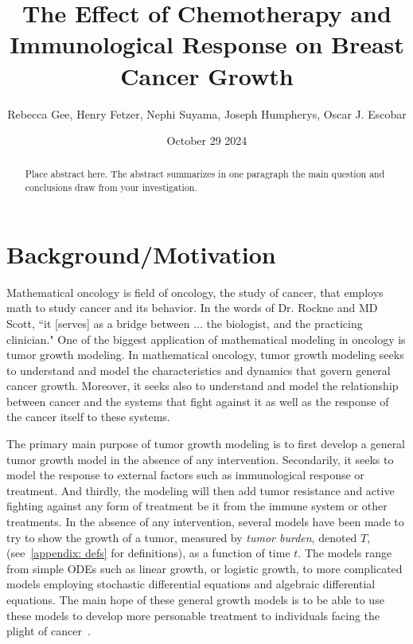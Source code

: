 \documentclass[11pt]{amsart}
\title{The Effect of Chemotherapy and Immunological Response on Breast Cancer Growth}
\author{Rebecca Gee, Henry Fetzer, Nephi Suyama, Joseph Humpherys, Oscar J. Escobar}
\date{October 29 2024} %
\begin{document}
\maketitle %

\begin{abstract}
Place abstract here. The abstract summarizes in one paragraph the main question and conclusions draw from your investigation.
\end{abstract}

\section{Background/Motivation}

Mathematical oncology is field of oncology, the study of cancer, that employs math to study cancer and its behavior.
In the words of Dr. Rockne and MD Scott, ``it [serves] as a bridge between $\ldots$ the biologist, and the practicing clinician."%
One of the biggest application of mathematical modeling in oncology is tumor growth modeling.
In mathematical oncology, tumor growth modeling seeks to understand and model the characteristics and dynamics that govern general cancer growth.
Moreover, it seeks also to understand and model the relationship between cancer and the systems that fight against it as well as the response of the cancer itself to these systems.

The primary main purpose of tumor growth modeling is to first develop a general tumor growth model in the absence of any intervention.
Secondarily, it seeks to model the response to external factors such as immunological response or treatment. 
And thirdly, the modeling will then add tumor resistance and active fighting against any form of treatment be it from the immune system or other treatments.
In the absence of any intervention, several models have been made to try to show the growth of a tumor, measured by \textit{tumor burden}, denoted $T$, (see\ \ref{appendix: defs} for definitions), as a function of time $t$.
The models range from simple ODEs such as linear growth, or logistic growth, to more complicated models employing stochastic differential equations and algebraic differential equations. 
The main hope of these general growth models is to be able to use these models to develop more personable treatment to individuals facing the plight of cancer\ \cite{YinMoes}.
\end{document}
